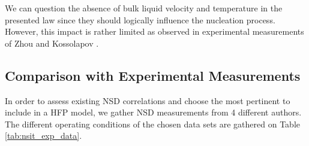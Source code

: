 \npar

\begin{remark*}{}
We can question the absence of bulk liquid velocity and temperature in the presented law since they should logically influence the nucleation process. However, this impact is rather limited as observed in experimental measurements of Zhou \etal \cite{zhou_experimental_2020} and Kossolapov \cite{kossolapov_experimental_2021}.
\end{remark*}

\subsection{Comparison with Experimental Measurements}

In order to assess existing NSD correlations and choose the most pertinent to include in a HFP model, we gather NSD measurements from 4 different authors. The different operating conditions of the chosen data sets are gathered on Table \ref{tab:nsit_exp_data}.


\begin{table}[h!]


\noindent{}

\caption{Nucleation Site Density data in flow boiling}
\label{tab:nsit_exp_data}


\end{table}



